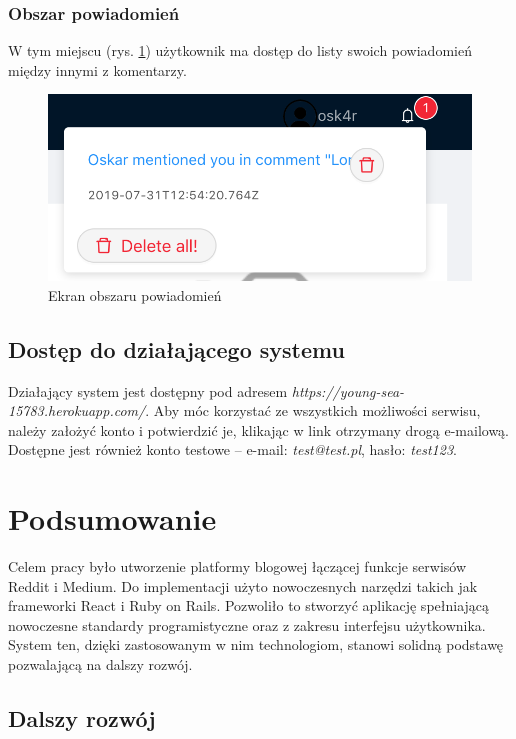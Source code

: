 \documentclass[declaration,shortabstract]{iithesis}
\begin{document}
\subsection{Obszar powiadomień}
W tym miejscu (rys. \ref{fig:notification}) użytkownik ma dostęp do listy swoich powiadomień między innymi z komentarzy.
\begin{figure}
    \centering
    \includegraphics[width=\linewidth]{images/powiadomienia.png}
    \caption{Ekran obszaru powiadomień}
    \label{fig:notification}
\end{figure}

\section{Dostęp do działającego systemu}
Działający system jest dostępny pod adresem \textit{https://young-sea-15783.herokuapp.com/}.  Aby móc korzystać ze wszystkich możliwości serwisu, należy założyć konto i potwierdzić je, klikając w link otrzymany drogą e-mailową. Dostępne jest również konto testowe – e-mail: \textit{test@test.pl}, hasło: \textit{test123}.

\chapter{Podsumowanie}
Celem pracy było utworzenie platformy blogowej łączącej funkcje serwisów Reddit i Medium. Do implementacji użyto nowoczesnych narzędzi takich jak frameworki React i Ruby on Rails. Pozwoliło to stworzyć aplikację spełniającą nowoczesne standardy programistyczne oraz z zakresu interfejsu użytkownika. System ten, dzięki zastosowanym w nim technologiom, stanowi solidną podstawę pozwalającą na dalszy rozwój.

\section{Dalszy rozwój}
\end{document}
